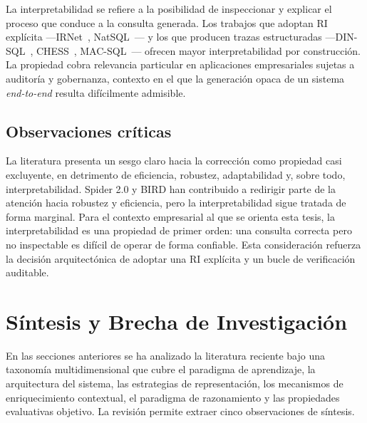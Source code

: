 La interpretabilidad se refiere a la posibilidad de inspeccionar y
explicar el proceso que conduce a la consulta generada. Los trabajos
que adoptan RI explícita ---IRNet~\cite{guo2019irnet},
NatSQL~\cite{gan2021natsql}--- y los que producen
trazas estructuradas ---DIN-SQL~\cite{DIN-SQL2023},
CHESS~\cite{CHESS2024}, MAC-SQL~\cite{MAC-SQL2023}--- ofrecen mayor
interpretabilidad por construcción. La propiedad cobra relevancia
particular en aplicaciones empresariales sujetas a auditoría y
gobernanza, contexto en el que la generación opaca de un sistema
\emph{end-to-end} resulta difícilmente admisible.

\subsection{Observaciones críticas}
\label{subsec:sota-d6-obs}

La literatura presenta un sesgo claro hacia la corrección como
propiedad casi excluyente, en detrimento de eficiencia, robustez,
adaptabilidad y, sobre todo, interpretabilidad. Spider 2.0 y BIRD han
contribuido a redirigir parte de la atención hacia robustez y
eficiencia, pero la interpretabilidad sigue tratada de forma marginal.
Para el contexto empresarial al que se orienta esta tesis, la
interpretabilidad es una propiedad de primer orden: una consulta
correcta pero no inspectable es difícil de operar de forma confiable.
Esta consideración refuerza la decisión arquitectónica de adoptar una
RI explícita y un bucle de verificación auditable.

\section{Síntesis y Brecha de Investigación}
\label{sec:sota-sintesis}

En las secciones anteriores se ha analizado la literatura reciente bajo
una taxonomía multidimensional que cubre el paradigma de aprendizaje, la
arquitectura del sistema, las estrategias de representación, los
mecanismos de enriquecimiento contextual, el paradigma de razonamiento y
las propiedades evaluativas objetivo. La revisión permite extraer cinco
observaciones de síntesis.

